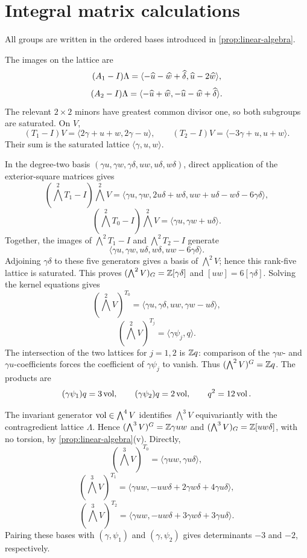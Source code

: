 \section{Integral matrix calculations}\label{sec:matrix-tables}
All groups are written in the ordered bases introduced in
\cref{prop:linear-algebra}.

The images on the lattice are
\[
 (A_1-I)\Lambda
 =\langle-\widehat u-\widehat w+\widehat\delta,
             \widehat u-2\widehat w\rangle,
\]
\[
 (A_2-I)\Lambda
 =\langle-\widehat u+\widehat w,
             -\widehat u-\widehat w+\widehat\delta\rangle.
\]
The relevant $2\times2$ minors have greatest common divisor one, so both
subgroups are saturated.  On $V$,
\[
 (T_1-I)V=\langle2\gamma+u+w,2\gamma-u\rangle,
 \qquad
 (T_2-I)V=\langle-3\gamma+u,u+w\rangle.
\]
Their sum is the saturated lattice $\langle\gamma,u,w\rangle$.

In the degree-two basis
$(\gamma u,\gamma w,\gamma\delta,uw,u\delta,w\delta)$, direct
application of the exterior-square matrices gives
\[
 (\textstyle\bigwedge^2T_1-I)\bigwedge^2V
 =\langle
 \gamma u,\gamma w,
 2u\delta+w\delta,
 uw+u\delta-w\delta-6\gamma\delta
 \rangle,
\]
\[
 (\textstyle\bigwedge^2T_0-I)\bigwedge^2V
 =\langle\gamma u,\gamma w+u\delta\rangle.
\]
Together, the images of $\bigwedge^2T_1-I$ and
$\bigwedge^2T_2-I$ generate
\[
 \langle\gamma u,\gamma w,u\delta,w\delta,
 uw-6\gamma\delta\rangle.
\]
Adjoining $\gamma\delta$ to these five generators gives a basis of
$\bigwedge^2V$; hence this rank-five lattice is saturated.  This proves
$(\bigwedge^2V)_G=\mathbb Z[\gamma\delta]$ and
$[uw]=6[\gamma\delta]$.  Solving the kernel equations gives
\[
 (\textstyle\bigwedge^2V)^{T_0}
 =\langle\gamma u,\gamma\delta,uw,\gamma w-u\delta\rangle,
\]
\[
 (\textstyle\bigwedge^2V)^{T_j}
 =\langle\gamma\psi_j,q\rangle.
\]
The intersection of the two lattices for $j=1,2$ is $\mathbb Z q$: comparison of
the $\gamma w$- and $\gamma u$-coefficients forces the coefficient of
$\gamma\psi_j$ to vanish.  Thus
$(\bigwedge^2V)^G=\mathbb Z q$.  The products are
\[
 (\gamma\psi_1)q=3\operatorname{vol},
 \qquad
 (\gamma\psi_2)q=2\operatorname{vol},
 \qquad
 q^2=12\operatorname{vol}.
\]

The invariant generator $\operatorname{vol}\in\bigwedge^4V$ identifies
$\bigwedge^3V$ equivariantly with the contragredient lattice $\Lambda$.  Hence
$(\bigwedge^3V)^G=\mathbb Z\gamma uw$ and
$(\bigwedge^3V)_G=\mathbb Z[uw\delta]$, with no torsion, by
\cref{prop:linear-algebra}(v).  Directly,
\[
 (\textstyle\bigwedge^3V)^{T_0}
 =\langle\gamma uw,\gamma u\delta\rangle,
\]
\[
 (\textstyle\bigwedge^3V)^{T_1}
 =\langle\gamma uw,-uw\delta+2\gamma w\delta+4\gamma u\delta\rangle,
\]
\[
 (\textstyle\bigwedge^3V)^{T_2}
 =\langle\gamma uw,-uw\delta+3\gamma w\delta+3\gamma u\delta\rangle.
\]
Pairing these bases with $(\gamma,\psi_1)$ and
$(\gamma,\psi_2)$ gives determinants $-3$ and $-2$, respectively.


